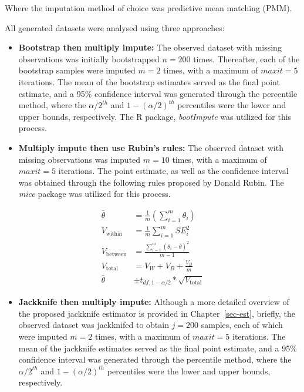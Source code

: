 \documentclass[
  letterpaper,
  DIV=11,
  numbers=noendperiod]{scrreprt}
\providecommand{\tightlist}{%
  \setlength{\itemsep}{0pt}\setlength{\parskip}{0pt}}\usepackage{longtable,booktabs,array}
\begin{document}
Where the imputation method of choice was predictive mean matching
(PMM).

All generated datasets were analysed using three approaches:

\begin{itemize}
\item
  \textbf{Bootstrap then multiply impute:} The observed dataset with
  missing observations was initially bootstrapped \(n = 200\) times.
  Thereafter, each of the bootstrap samples were imputed \(m = 2\)
  times, with a maximum of \(maxit = 5\) iterations. The mean of the
  bootstrap estimates served as the final point estimate, and a 95\%
  confidence interval was generated through the percentile method, where
  the \(\alpha/2^{th}\) and \(1-(\alpha/2)^{th}\) percentiles were the
  lower and upper bounds, respectively. The R package, \emph{bootImpute}
  was utilized for this process.
\item
  \textbf{Multiply impute then use Rubin's rules:} The observed dataset
  with missing observations was imputed \(m = 10\) times, with a maximum
  of \(maxit = 5\) iterations. The point estimate, as well as the
  confidence interval was obtained through the following rules proposed
  by Donald Rubin. The \emph{mice} package was utilized for this
  process.
\end{itemize}

\begin{align}
\bar{\theta} &= \frac{1}{m}\left (\sum_{i=1}^m{\theta_i}\right ) \\ 
V_{\text{within}} &= \frac{1}{m} \sum_{i=1}^m{SE_i^2} \\ 
V_{\text{between}} &= \frac{\sum_{i=1}^m (\theta_i - \overline{\theta})^2}{m-1} \\ 
V_{\text{total}} &= V_W + V_B + \frac{V_B}{m} \\ 
\bar{\theta} &\pm t_{df,1-\alpha/2} * \sqrt{V_{\text{total}}} 
\end{align}

\begin{itemize}
\tightlist
\item
  \textbf{Jackknife then multiply impute:} Although a more detailed
  overview of the proposed jackknife estimator is provided in
  Chapter~\ref{sec-est}, briefly, the observed dataset was jackknifed to
  obtain \(j = 200\) samples, each of which were imputed \(m = 2\)
  times, with a maximum of \(maxit = 5\) iterations. The mean of the
  jackknife estimates served as the final point estimate, and a 95\%
  confidence interval was generated through the percentile method, where
  the \(\alpha/2^{th}\) and \(1-(\alpha/2)^{th}\) percentiles were the
  lower and upper bounds, respectively.
\end{itemize}
\end{document}
